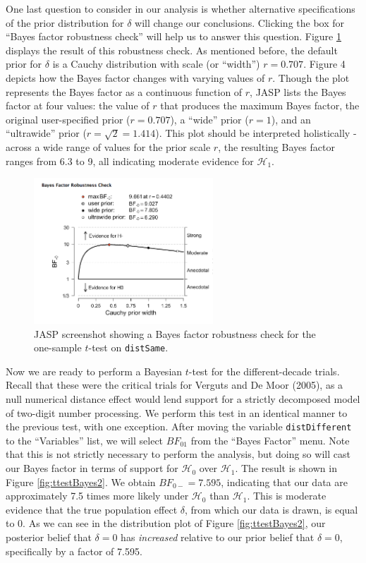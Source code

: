 \documentclass[english,,doc,floatsintext]{apa6}
\begin{document}
One last question to consider in our analysis is whether alternative specifications of the prior distribution for \(\delta\) will change our conclusions. Clicking the box for \enquote{Bayes factor robustness check} will help us to answer this question. Figure \ref{fig:ttestRobust} displays the result of this robustness check. As mentioned before, the default prior for \(\delta\) is a Cauchy distribution with scale (or \enquote{width}) \(r=0.707\). Figure 4 depicts how the Bayes factor changes with varying values of \(r\). Though the plot represents the Bayes factor as a continuous function of \(r\), JASP lists the Bayes factor at four values: the value of \(r\) that produces the maximum Bayes factor, the original user-specified prior (\(r=0.707\)), a \enquote{wide} prior (\(r=1\)), and an \enquote{ultrawide} prior (\(r=\sqrt{2}=1.414\)). This plot should be interpreted holistically - across a wide range of values for the prior scale \(r\), the resulting Bayes factor ranges from 6.3 to 9, all indicating moderate evidence for \(\mathcal{H}_1\).

\begin{figure}
\centering
\includegraphics[width=0.6\textwidth,height=\textheight]{figures/ttestRobust.png}
\caption{\label{fig:ttestRobust}JASP screenshot showing a Bayes factor robustness check for the one-sample \(t\)-test on \texttt{distSame}.}
\end{figure}

Now we are ready to perform a Bayesian \(t\)-test for the different-decade trials. Recall that these were the critical trials for Verguts and De Moor (2005), as a null numerical distance effect would lend support for a strictly decomposed model of two-digit number processing. We perform this test in an identical manner to the previous test, with one exception. After moving the variable \texttt{distDifferent} to the \enquote{Variables} list, we will select \(BF_{01}\) from the \enquote{Bayes Factor} menu. Note that this is not strictly necessary to perform the analysis, but doing so will cast our Bayes factor in terms of support for \(\mathcal{H}_0\) over \(\mathcal{H}_1\). The result is shown in Figure \ref{fig:ttestBayes2}. We obtain \(BF_{0-}=7.595\), indicating that our data are approximately 7.5 times more likely under \(\mathcal{H}_0\) than \(\mathcal{H}_1\). This is moderate evidence that the true population effect \(\delta\), from which our data is drawn, is equal to 0. As we can see in the distribution plot of Figure \ref{fig:ttestBayes2}, our posterior belief that \(\delta=0\) has \emph{increased} relative to our prior belief that \(\delta=0\), specifically by a factor of 7.595.
\end{document}

